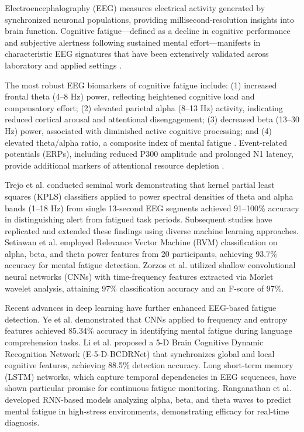 \documentclass[journal,twoside,10pt]{IEEEtran}
\begin{document}
Electroencephalography (EEG) measures electrical activity generated by synchronized neuronal populations, providing millisecond-resolution insights into brain function. Cognitive fatigue---defined as a decline in cognitive performance and subjective alertness following sustained mental effort---manifests in characteristic EEG signatures that have been extensively validated across laboratory and applied settings \cite{ref1,ref4,ref18,ref28}.

The most robust EEG biomarkers of cognitive fatigue include: (1) increased frontal theta (4--8 Hz) power, reflecting heightened cognitive load and compensatory effort; (2) elevated parietal alpha (8--13 Hz) activity, indicating reduced cortical arousal and attentional disengagement; (3) decreased beta (13--30 Hz) power, associated with diminished active cognitive processing; and (4) elevated theta/alpha ratio, a composite index of mental fatigue \cite{ref1,ref4,ref5,ref10,ref18}. Event-related potentials (ERPs), including reduced P300 amplitude and prolonged N1 latency, provide additional markers of attentional resource depletion \cite{ref4,ref23}.

Trejo et al. \cite{ref1,ref4} conducted seminal work demonstrating that kernel partial least squares (KPLS) classifiers applied to power spectral densities of theta and alpha bands (1--18 Hz) from single 13-second EEG segments achieved 91--100\% accuracy in distinguishing alert from fatigued task periods. Subsequent studies have replicated and extended these findings using diverse machine learning approaches. Setiawan et al. \cite{ref9} employed Relevance Vector Machine (RVM) classification on alpha, beta, and theta power features from 20 participants, achieving 93.7\% accuracy for mental fatigue detection. Zorzos et al. \cite{ref10} utilized shallow convolutional neural networks (CNNs) with time-frequency features extracted via Morlet wavelet analysis, attaining 97\% classification accuracy and an F-score of 97\%.

Recent advances in deep learning have further enhanced EEG-based fatigue detection. Ye et al. \cite{ref14} demonstrated that CNNs applied to frequency and entropy features achieved 85.34\% accuracy in identifying mental fatigue during language comprehension tasks. Li et al. \cite{ref24} proposed a 5-D Brain Cognitive Dynamic Recognition Network (E-5-D-BCDRNet) that synchronizes global and local cognitive features, achieving 88.5\% detection accuracy. Long short-term memory (LSTM) networks, which capture temporal dependencies in EEG sequences, have shown particular promise for continuous fatigue monitoring. Ranganathan et al. \cite{ref8} developed RNN-based models analyzing alpha, beta, and theta waves to predict mental fatigue in high-stress environments, demonstrating efficacy for real-time diagnosis.
\end{document}
